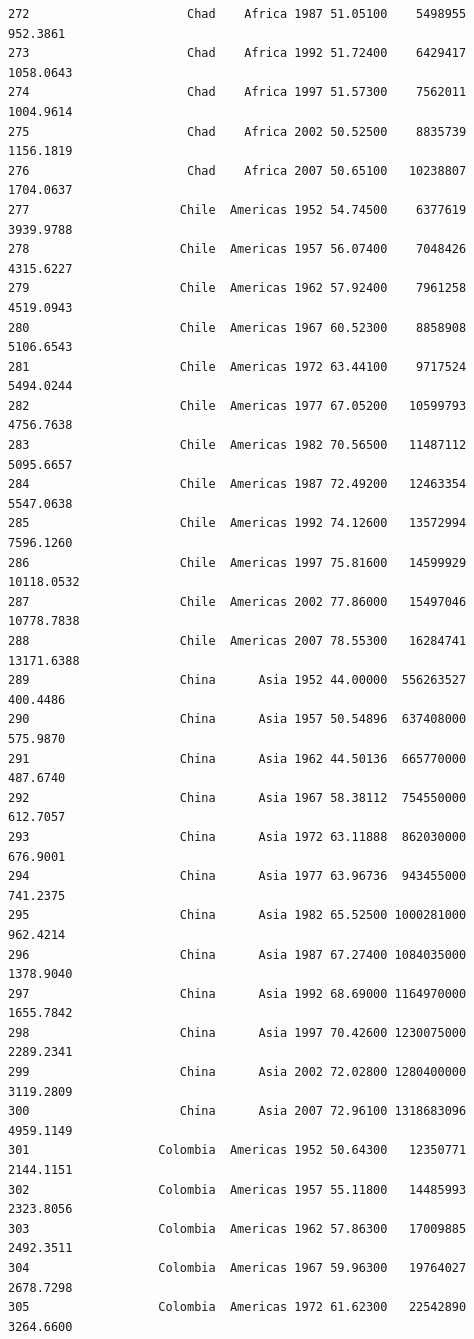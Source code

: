 \documentclass[
  letterpaper,
  DIV=11,
  numbers=noendperiod]{scrreprt}
\begin{document}
\begin{verbatim}
272                      Chad    Africa 1987 51.05100    5498955    952.3861
273                      Chad    Africa 1992 51.72400    6429417   1058.0643
274                      Chad    Africa 1997 51.57300    7562011   1004.9614
275                      Chad    Africa 2002 50.52500    8835739   1156.1819
276                      Chad    Africa 2007 50.65100   10238807   1704.0637
277                     Chile  Americas 1952 54.74500    6377619   3939.9788
278                     Chile  Americas 1957 56.07400    7048426   4315.6227
279                     Chile  Americas 1962 57.92400    7961258   4519.0943
280                     Chile  Americas 1967 60.52300    8858908   5106.6543
281                     Chile  Americas 1972 63.44100    9717524   5494.0244
282                     Chile  Americas 1977 67.05200   10599793   4756.7638
283                     Chile  Americas 1982 70.56500   11487112   5095.6657
284                     Chile  Americas 1987 72.49200   12463354   5547.0638
285                     Chile  Americas 1992 74.12600   13572994   7596.1260
286                     Chile  Americas 1997 75.81600   14599929  10118.0532
287                     Chile  Americas 2002 77.86000   15497046  10778.7838
288                     Chile  Americas 2007 78.55300   16284741  13171.6388
289                     China      Asia 1952 44.00000  556263527    400.4486
290                     China      Asia 1957 50.54896  637408000    575.9870
291                     China      Asia 1962 44.50136  665770000    487.6740
292                     China      Asia 1967 58.38112  754550000    612.7057
293                     China      Asia 1972 63.11888  862030000    676.9001
294                     China      Asia 1977 63.96736  943455000    741.2375
295                     China      Asia 1982 65.52500 1000281000    962.4214
296                     China      Asia 1987 67.27400 1084035000   1378.9040
297                     China      Asia 1992 68.69000 1164970000   1655.7842
298                     China      Asia 1997 70.42600 1230075000   2289.2341
299                     China      Asia 2002 72.02800 1280400000   3119.2809
300                     China      Asia 2007 72.96100 1318683096   4959.1149
301                  Colombia  Americas 1952 50.64300   12350771   2144.1151
302                  Colombia  Americas 1957 55.11800   14485993   2323.8056
303                  Colombia  Americas 1962 57.86300   17009885   2492.3511
304                  Colombia  Americas 1967 59.96300   19764027   2678.7298
305                  Colombia  Americas 1972 61.62300   22542890   3264.6600

\end{verbatim}
\end{document}
